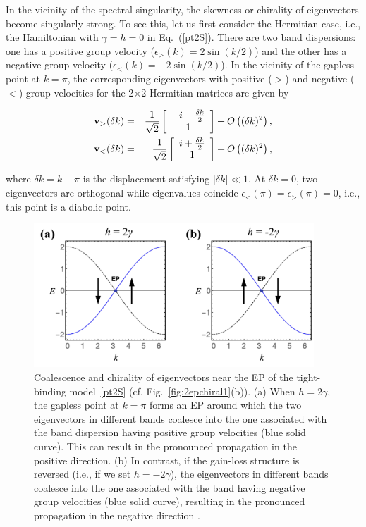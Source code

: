 \documentclass{tADP2e}
\theoremstyle{plain}
\newcommand{\eqn}[1]{
\begin{eqnarray}
	#1
\end{eqnarray}
}
\theoremstyle{plain}
\theoremstyle{definition}
\begin{document}
{ In the vicinity of the spectral singularity, the skewness or chirality of eigenvectors become singularly strong. To see this, let us first consider the  Hermitian case, i.e., the Hamiltonian with $\gamma=h=0$ in Eq.~(\ref{pt2S}).  There are two band dispersions: one has a positive group velocity ($\epsilon_{>}(k)=2\sin(k/2)$) and the other has a negative group velocity ($\epsilon_{<}(k)=-2\sin(k/2)$). In the vicinity of the gapless point at $k=\pi$, the corresponding eigenvectors with positive ($>$) and negative ($<$) group velocities for the 2$\times$2 Hermitian matrices are given by
\eqn{
{\bf v}_{>}(\delta k)&=&\frac{1}{\sqrt{2}}\left[\begin{array}{c}
-i-\frac{\delta k}{2}\\
1
\end{array}\right]+O\left((\delta k)^2\right),\label{clposi}\\
{\bf v}_{<}(\delta k)&=&\frac{1}{\sqrt{2}}\left[\begin{array}{c}
i+\frac{\delta k}{2}\\
1
\end{array}\right]+O\left((\delta k)^2\right),\label{clnega}
}
where $\delta k=k-\pi$ is the displacement satisfying $|\delta k|\ll 1$. 
At $\delta k=0$, two eigenvectors are orthogonal while eigenvalues coincide $\epsilon_{<}(\pi)=\epsilon_>(\pi)=0$, i.e., this point is a diabolic point.

\begin{figure}
\begin{center}
\includegraphics[width=10.5cm]{./Figures/fig_2_ep_chiral2.pdf}
\end{center}
\caption{Coalescence and chirality of eigenvectors near the EP of the tight-binding model~\eqref{pt2S} (cf. Fig.~\ref{fig:2epchiral1}(b)). (a) When $h=2\gamma$, the gapless point at $k=\pi$ forms an EP around which the two eigenvectors in different bands coalesce into the one associated with the band dispersion having positive group velocities (blue solid curve). This can result in the pronounced propagation in the positive direction. (b) In contrast, if the gain-loss structure is reversed (i.e., if we set $h=-2\gamma$), the eigenvectors in different bands coalesce into the one associated with the band having negative group velocities (blue solid curve), resulting in the pronounced propagation in the negative direction \cite{YA18}.}
\label{fig:2epchiral2}
\end{figure}

}
\end{document}
